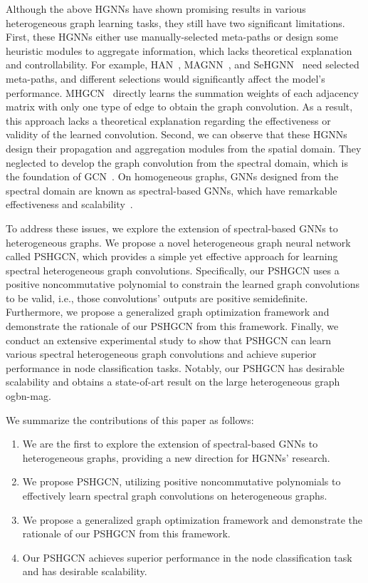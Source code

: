 \documentclass{article}
\begin{document}
Although the above HGNNs have shown promising results in various heterogeneous graph learning tasks, they still have two significant limitations. First, these HGNNs either use manually-selected meta-paths or design some heuristic modules to aggregate information, which lacks theoretical explanation and controllability. For example, HAN~\cite{han}, MAGNN~\cite{magnn}, and SeHGNN~\cite{sehgnn} need selected meta-paths, and different selections would significantly affect the model's performance. MHGCN~\cite{mhgcn} directly learns the summation weights of each adjacency matrix with only one type of edge to obtain the graph convolution. As a result, this approach lacks a theoretical explanation regarding the effectiveness or validity of the learned convolution. Second, we can observe that these HGNNs design their propagation and aggregation modules from the spatial domain. They neglected to develop the graph convolution from the spectral domain, which is the foundation of GCN~\cite{gcn}. On homogeneous graphs, GNNs designed from the spectral domain are known as spectral-based GNNs, which have remarkable effectiveness and scalability~\cite{gprgnn,bernnet,jacobi,chebnetii}.

To address these issues, we explore the extension of spectral-based GNNs to heterogeneous graphs. We propose a novel heterogeneous graph neural network called PSHGCN, which provides a simple yet effective approach for learning spectral heterogeneous graph convolutions. Specifically, our PSHGCN uses a positive noncommutative polynomial to constrain the learned graph convolutions to be valid, i.e., those convolutions' outputs are positive semidefinite. Furthermore, we propose a generalized graph optimization framework and demonstrate the rationale of our PSHGCN from this framework. Finally, we conduct an extensive experimental study to show that PSHGCN can learn various spectral heterogeneous graph convolutions and achieve superior performance in node classification tasks. Notably, our PSHGCN has desirable scalability and obtains a state-of-art result on the large heterogeneous graph ogbn-mag.

We summarize the contributions of this paper as follows:
\begin{enumerate}[label=\alph*)]
    \item We are the first to explore the extension of spectral-based GNNs to heterogeneous graphs, providing a new direction for HGNNs' research.  
    \item We propose PSHGCN, utilizing positive noncommutative polynomials to effectively learn spectral graph convolutions on heterogeneous graphs. 
    \item We propose a generalized graph optimization framework and demonstrate the rationale of our PSHGCN from this framework.
    \item Our PSHGCN achieves superior performance in the node classification task and has desirable scalability.
\end{enumerate}
\end{document}
